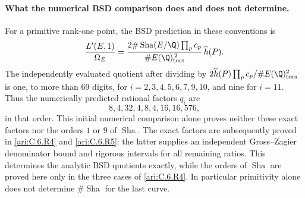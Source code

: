 \paragraph{What the numerical BSD comparison does and does not determine.}
For a primitive rank-one point, the BSD prediction in these conventions is
\[
 \frac{L'(E,1)}{\Omega_E}
 =\frac{2\#\operatorname{Sha}(E/\Q)\prod_pc_p}
        {\#E(\Q)_{\rm tors}^{\,2}}\,\widehat h(P).
\]
The independently evaluated quotient after dividing by
$2\widehat h(P)\prod_pc_p/\#E(\Q)_{\rm tors}^2$ is one, to
more than 69 digits, for $i=2,3,4,5,6,7,9,10$, and nine for
$i=11$. Thus the numerically predicted rational factors $q_i$ are
\[
 8,4,32,4,8,4,16,16,576,
\]
in that order. This initial numerical comparison alone proves neither
these exact factors nor the orders $1$ or $9$ of $\operatorname{Sha}$.
The exact factors are subsequently proved in \ref{ari:C.6.R4} and \ref{ari:C.6.R5}:
the latter supplies an independent Gross--Zagier denominator bound
and rigorous intervals for all remaining ratios. This determines
the analytic BSD quotients exactly, while the orders of
$\operatorname{Sha}$ are proved here only in the three cases of
\ref{ari:C.6.R4}. In particular primitivity alone does not determine
$\#\operatorname{Sha}$ for the last curve.


